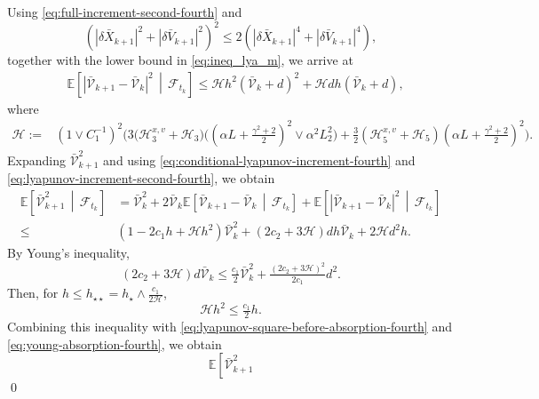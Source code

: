 \documentclass[12pt]{article}
\newenvironment{redtext}
  {\color{black}\ignorespaces}
  {\ignorespacesafterend}
\numberwithin{equation}{section}
\renewenvironment{proof}%
  {\begin{trivlist}%
   \item[]\ignorespaces}%
  {\qed\end{trivlist}}
\renewcommand{\H}{\mathcal{H}}
\begin{document}
\begin{redtext}
\begin{proof}
Using
\eqref{eq:full-increment-second-fourth} and
\[
\left(
|\delta\bar X_{k+1}|^2
+
|\delta\bar V_{k+1}|^2
\right)^2
\leq
2\left(
|\delta\bar X_{k+1}|^4
+
|\delta\bar V_{k+1}|^4
\right),
\]
together with the lower bound in \eqref{eq:ineq_lya_m}, we arrive at
\begin{equation}
\label{eq:lyapunov-increment-second-fourth}
\begin{aligned}
&\mathbb E
\left[
\left|
\bar{\mathcal V}_{k+1}-\bar{\mathcal V}_k
\right|^2
\,\middle|\,
\mathcal F_{t_k}
\right]
\leq
\H h^2
\left(
\bar{\mathcal V}_k+d
\right)^2
+
\H dh
\left(
\bar{\mathcal V}_k+d
\right),
\end{aligned}
\end{equation}
where
\begin{align}
\H
:={}&
(1\vee C_1^{-1})^2
\Big(
3
\big(
\H_3^{x,v}+\H_3
\big)
\big(
(
\alpha L
+
\tfrac{\gamma^2+2}{2}
)^2
\vee
\alpha^2L_2^2
\big)
+
\tfrac32
\left(
\H_5^{x,v}+\H_5
\right)
(
\alpha L
+
\tfrac{\gamma^2+2}{2}
)^2
\Big).
\label{eq:H-fourth-moment}
\end{align}
Expanding $\bar{\mathcal V}_{k+1}^2$ and using
\eqref{eq:conditional-lyapunov-increment-fourth} and
\eqref{eq:lyapunov-increment-second-fourth}, we obtain
\begin{align}
\mathbb E
\left[
\bar{\mathcal V}_{k+1}^2
\,\middle|\,
\mathcal F_{t_k}
\right]&
=
\bar{\mathcal V}_k^2
+
2\bar{\mathcal V}_k
\mathbb E
\left[
\bar{\mathcal V}_{k+1}
-
\bar{\mathcal V}_k
\,\middle|\,
\mathcal F_{t_k}
\right]
+
\mathbb E
\left[
\left|
\bar{\mathcal V}_{k+1}
-
\bar{\mathcal V}_k
\right|^2
\,\middle|\,
\mathcal F_{t_k}
\right]
\nonumber\\
\leq{}&
\left(
1-2c_1h+\H  h^2
\right)
\bar{\mathcal V}_k^2
+
\left(
2c_2+3\H
\right)
dh\bar{\mathcal V}_k
+
2\H d^2h.
\label{eq:lyapunov-square-before-absorption-fourth}
\end{align}
By Young's inequality,
\begin{equation}
\label{eq:young-absorption-fourth}
\left(
2c_2+3\H 
\right)d\bar{\mathcal V}_k
\leq
\tfrac{c_1}{2}\bar{\mathcal V}_k^2
+
\tfrac{
\left(
2c_2+3\H 
\right)^2
}{2c_1}d^2.
\end{equation}
Then, for $h\leq h_{\star\star}=
h_\star
\wedge
\tfrac{c_1}{2\H}$,
\[
\H h^2
\leq
\tfrac{c_1}{2}h.
\]
Combining this inequality with
\eqref{eq:lyapunov-square-before-absorption-fourth} and
\eqref{eq:young-absorption-fourth}, we obtain
\begin{equation}
\label{eq:lyapunov-square-recursion-fourth}
\mathbb E
\left[
\bar{\mathcal V}_{k+1}^2

\end{equation}
\end{proof}
\end{redtext}
\end{document}
